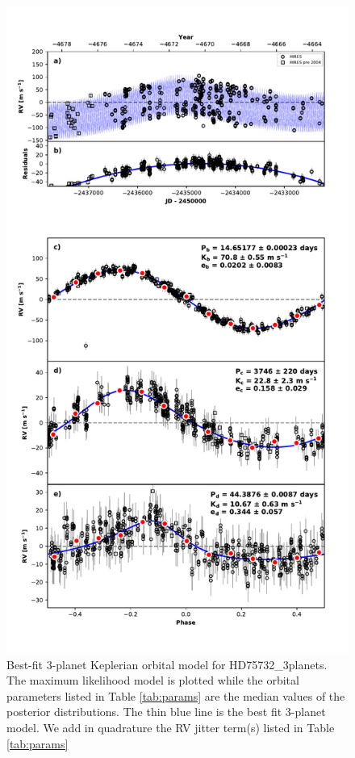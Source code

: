 \documentclass{emulateapj}
\begin{document}
\begin{figure}[!h]
\centering
\includegraphics[width=6.5in]{HD75732_3planet_rv_multipanel.pdf}
\caption{
Best-fit 3-planet Keplerian orbital model for HD75732\_3planets.
The maximum likelihood model is plotted while the orbital parameters listed in Table \ref{tab:params}
are the median values of the posterior distributions.
The thin blue line is the best fit 3-planet model. We add in quadrature the RV jitter term(s) listed in Table \ref{tab:params}
}
\end{figure}
\end{document}
